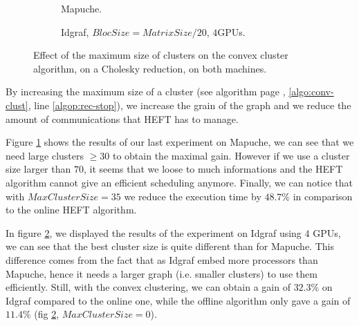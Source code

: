 \documentclass[10pt, conference, compsocconf,pdftex,dvipsnames]{IEEEtran}
\begin{document}
\begin{figure}[tb]
    \centering
    \begin{subfigure}{0.4\textwidth}
        \hspace{-20pt}
        \scalebox{0.7}{
            
        }
        \caption{Mapuche.}
        \label{fig:ClustersMapuche}
    \end{subfigure}
    \hspace{15pt}
    \begin{subfigure}{0.55\textwidth}
        \scalebox{0.7}{
            
        }
        \caption{Idgraf, $BlocSize=MatrixSize/20$, $4$GPUs.}
        \label{fig:ClustersIdgraf}
    \end{subfigure}

    \caption{Effect of the maximum size of clusters on the convex cluster
    algorithm, on a Cholesky reduction, on both machines.}
    \label{fig:Clusters}
\end{figure}

By increasing the maximum size of a cluster (see algorithm
page \pageref{algo:conv-clust}, \ref{algo:conv-clust}, line
\ref{algop:rec-stop}), we increase the grain of the graph and we reduce the
amount of communications that HEFT has to manage.

Figure \ref{fig:ClustersMapuche} shows the results of our last experiment on
Mapuche, we can see that we need large clusters $\geq 30$ to obtain the maximal
gain. However if we use a cluster size larger than $70$, it seems that we
loose to much informations and the HEFT algorithm cannot give an efficient
scheduling anymore. Finally, we can notice that with $MaxClusterSize=35$ we
reduce the execution time by $48.7\%$ in comparison to the online HEFT
algorithm.

In figure \ref{fig:ClustersIdgraf}, we displayed the results of the
experiment on Idgraf using $4$ GPUs, we can see that the best cluster size is
quite different than for Mapuche. This difference comes from the fact that as
Idgraf embed more processors than Mapuche, hence it needs a larger graph (i.e.
smaller clusters) to use them efficiently. Still, with the convex clustering,
we can obtain a gain of $32.3\%$ on Idgraf compared to the online one, while
the offline algorithm only gave a gain of $11.4\%$ (fig
\ref{fig:ClustersIdgraf}, $MaxClusterSize=0$).
\end{document}
